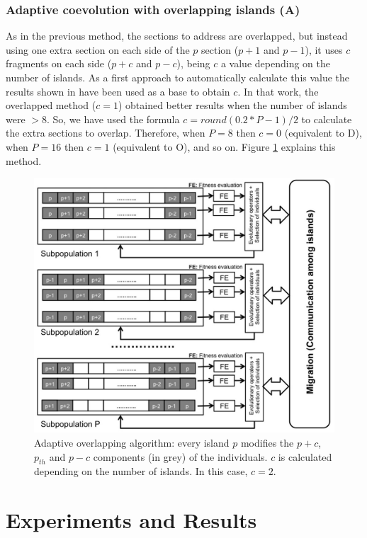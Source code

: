 \documentclass[Afour,sageh,times]{sagej}
\begin{document}
\subsubsection{Adaptive coevolution with overlapping islands (A)} 
As in the previous method, the sections to address are overlapped, but instead using one extra section on each side of the $p$ section ($p+1$ and $p-1$), it uses $c$ fragments on each side ($p+c$ and $p-c$), being $c$ a value depending on the number of islands. As a first approach to automatically calculate this value the results shown in \citep{Garcia16hpmoon} have been used as a base to obtain $c$. In that work, the overlapped method ($c=1$) obtained better results when the number of islands were $>$8. So, we have used the formula $c=round(0.2*P-1)/2$ to calculate the extra sections to overlap. Therefore, when $P=8$ then $c=0$ (equivalent to D), when $P=16$ then $c=1$ (equivalent to O), and so on. Figure \ref{fig:adaptive} explains this method.

\begin{figure}
\centering
\includegraphics[width=12cm]{islandAdaptive.jpg}
\caption{Adaptive overlapping algorithm: every island $p$ modifies the  $p+c$,
  $p_{th}$ and $p-c$  components (in grey) of the individuals. $c$ is calculated depending on the number of islands. In this case, $c=2$.}
  \label{fig:adaptive}
\end{figure}


%
\section{Experiments and Results}
\label{sec:res}
\end{document}
